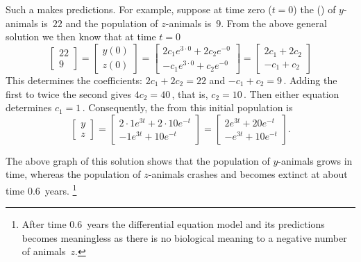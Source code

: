 Such a  makes predictions. 
For example, suppose at time zero (\(t=0\)) the  () of \(y\)-animals is~\(22\) and the population of \(z\)-animals is~\(9\).
From the above general solution we then know that at time \(t=0\)
\begin{equation*}
\begin{bmatrix} 22\\9 \end{bmatrix}=
\begin{bmatrix} y(0)\\z(0) \end{bmatrix}
=\begin{bmatrix} 2c_1e^{3\cdot0}+2c_2e^{-0}
\\ -c_1e^{3\cdot0}+c_2e^{-0} \end{bmatrix}
=\begin{bmatrix} 2c_1+2c_2
\\ -c_1+c_2 \end{bmatrix}
\end{equation*}
This determines the coefficients: \(2c_1+2c_2=22\)
and \(-c_1+c_2=9\)\,.
Adding the first to twice the second gives \(4c_2=40\)\,, that is, \(c_2=10\)\,.
Then either equation determines \(c_1=1\)\,.
Consequently, the  from this initial population is
\begin{equation*}
\begin{bmatrix} y\\z \end{bmatrix}
=\begin{bmatrix} 2\cdot1e^{3t}+2\cdot10e^{-t}
\\ -1e^{3t}+10e^{-t}\end{bmatrix}
=\begin{bmatrix} 2e^{3t}+20e^{-t}
\\ -e^{3t}+10e^{-t}\end{bmatrix}.
\end{equation*}
\begin{center}
\end{center}
The above graph of this solution shows that the population of \(y\)-animals grows in time, whereas the population of \(z\)-animals crashes and becomes extinct at about time \(0.6\)~years.%
\footnote{After time \(0.6\)~years the differential equation model  and its predictions becomes meaningless as there is no biological meaning to a negative number of animals~\(z\).}



